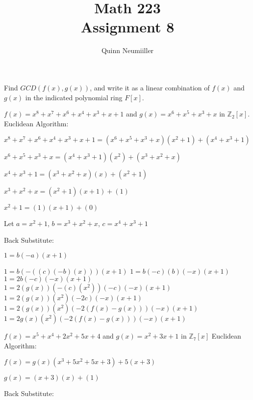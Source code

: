 \documentclass[12pt]{article}
\newcommand{\Z}{\mathbb{Z}}
\newenvironment{question}[2][Question]{\begin{trivlist}
\item[\hskip \labelsep {\bfseries #1}\hskip \labelsep {\bfseries #2.}]}{\end{trivlist}}
\begin{document}
 
\title{Math 223 \\
Assignment 8
}
\author{Quinn Neumiiller} 

\maketitle

\begin{question}{1}
Find $GCD(f(x), g(x))$, and write it as a linear combination of $f(x)$ and $g(x)$ in the
indicated polynomial ring $F[x]$.

\begin{question}{1a}$f(x) = x^8 + x^7 + x^6 + x^4 + x^3 + x + 1$ and $g(x) = x^6 + x^5 + x^3 + x$ in $\Z_{2}[x]$.
Euclidean Algorithm:

$x^8 + x^7 + x^6 + x^4 + x^3 + x + 1 = (x^6 + x^5 + x^3 + x)(x^2 + 1) + (x^4 + x^3 + 1)$

$x^6 + x^5 + x^3 + x = (x^4 + x^3 + 1)(x^2) + (x^3 + x^2 + x)$

$x^4 + x^3 + 1 = (x^3 + x^2 + x)(x) + (x^2+1)$ %

$x^3 + x^2 + x = (x^2+1)(x+1) + (1)$ %

$x^2 + 1 = (1)(x+1) + (0)$ %

Let $a = x^2+1$, $b = x^3 + x^2 + x$, $c = x^4 + x^3 + 1$

Back Substitute: 

$1 = b(-a)(x+1)$

$1 = b(-((c)(-b)(x)))(x+1)$
$1 = b(-c)(b)(-x)(x+1)$
$1 = 2b(-c)(-x)(x+1)$
$1 = 2(g(x))(-(c)(x^2))(-c)(-x)(x+1)$
$1 = 2(g(x))(x^2)(-2c)(-x)(x+1)$
$1 = 2(g(x))(x^2)(-2(f(x)-g(x)))(-x)(x+1)$
$1 = 2g(x)(x^2)(-2(f(x)-g(x)))(-x)(x+1)$


\end{question}

\begin{question}{1b}$f(x) = x^5 + x^4 + 2x^2 + 5x + 4$ and $g(x) = x^2 + 3x + 1$ in $\Z_{7}[x]$
Euclidean Algorithm:

$f(x) = g(x)(x^3 + 5x^2 + 5x + 3) + 5(x + 3)$ %

$g(x) = (x + 3)(x) + (1)$

Back Substitute: 


\end{question}
\end{question}
\end{document}
